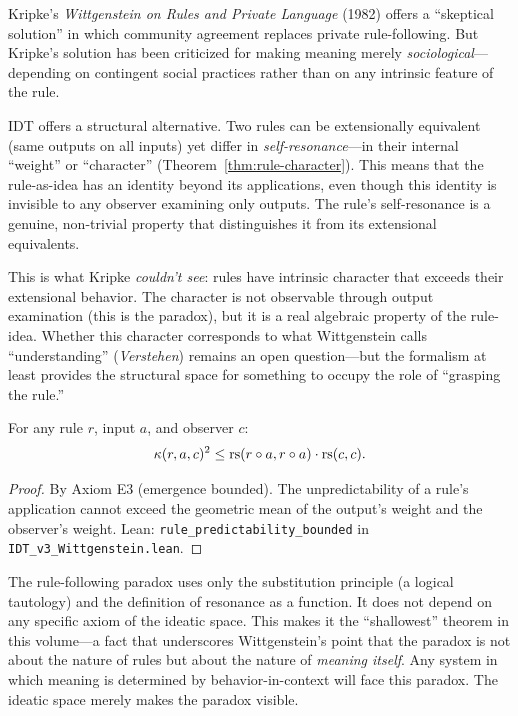 \begin{interpretation}
\label{interp:beyond-kripke}
Kripke's \textit{Wittgenstein on Rules and Private Language} (1982) offers
a ``skeptical solution'' in which community agreement replaces private
rule-following. But Kripke's solution has been criticized for making meaning
merely \emph{sociological}---depending on contingent social practices rather
than on any intrinsic feature of the rule.

IDT offers a structural alternative. Two rules can be extensionally equivalent
(same outputs on all inputs) yet differ in \emph{self-resonance}---in their
internal ``weight'' or ``character'' (Theorem~\ref{thm:rule-character}).
This means that the rule-as-idea has an identity beyond its applications,
even though this identity is invisible to any observer examining only outputs.
The rule's self-resonance is a genuine, non-trivial property that distinguishes
it from its extensional equivalents.

This is what Kripke \emph{couldn't see}: rules have intrinsic character
that exceeds their extensional behavior. The character is not observable
through output examination (this is the paradox), but it is a real algebraic
property of the rule-idea. Whether this character corresponds to what
Wittgenstein calls ``understanding'' (\textit{Verstehen}) remains an
open question---but the formalism at least provides the structural space
for something to occupy the role of ``grasping the rule.''
\end{interpretation}

\begin{theorem}
\label{thm:predictability-bounded}
For any rule $r$, input $a$, and observer $c$:
\[
\kappa(r, a, c)^2 \leq \mathrm{rs}(r \circ a, r \circ a) \cdot \mathrm{rs}(c, c).
\]
\end{theorem}

\begin{proof}
By Axiom E3 (emergence bounded). The unpredictability of a rule's application
cannot exceed the geometric mean of the output's weight and the observer's weight.
Lean: \texttt{rule\_predictability\_bounded} in \texttt{IDT\_v3\_Wittgenstein.lean}.
\end{proof}

\begin{remark}
The rule-following paradox uses only the substitution principle (a logical
tautology) and the definition of resonance as a function. It does not depend on
any specific axiom of the ideatic space. This makes it the ``shallowest''
theorem in this volume---a fact that underscores Wittgenstein's point that
the paradox is not about the nature of rules but about the nature of
\emph{meaning itself}. Any system in which meaning is determined by
behavior-in-context will face this paradox. The ideatic space merely makes
the paradox visible.
\end{remark}

